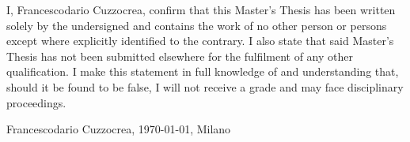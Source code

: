 I, Francescodario Cuzzocrea, confirm that this Master’s Thesis has been written solely by the undersigned and contains the work of no other person or persons except where explicitly identified to the contrary. I also state that said Master’s Thesis has not been submitted elsewhere for the fulfilment of any other qualification. I make this statement in full knowledge of and understanding that, should it be found to be false, I will not receive a grade and
may face disciplinary proceedings.

\vspace{2cm}

Francescodario Cuzzocrea, \today, Milano
